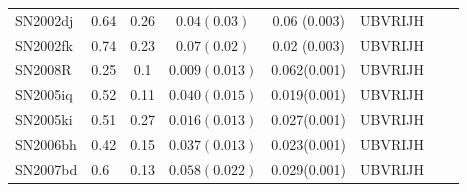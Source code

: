 \begin{table*}
\begin{center}
\begin{tabular}{llcccrrr}
SN2002dj	&	0.64	&	0.26		&	$   0.04 (0.03)$ & 0.06 (0.003)		& UBVRIJH		\\
SN2002fk	&	0.74	&	0.23		&	$0.07 (0.02)$   & 0.02 (0.003)		& UBVRIJH 				\\
SN2008R		&	0.25	&	0.1		&  $0.009(0.013)$ & 0.062(0.001)          & 	UBVRIJH		\\
SN2005iq	&	0.52	&	0.11		& $0.040(0.015)$ & 0.019(0.001) & UBVRIJH	\\	
SN2005ki	&	0.51	&	0.27		& $0.016(0.013)$ & 0.027(0.001) & UBVRIJH	\\
SN2006bh	&	0.42	&	0.15		& $0.037(0.013)$ & 0.023(0.001) & UBVRIJH	\\
SN2007bd	&	0.6	&	0.13		&  $0.058(0.022)$ & 0.029(0.001)        & UBVRIJH	\\
\hline
\end{tabular}
\label{tab:lr}
\end{center}
\end{table*}
